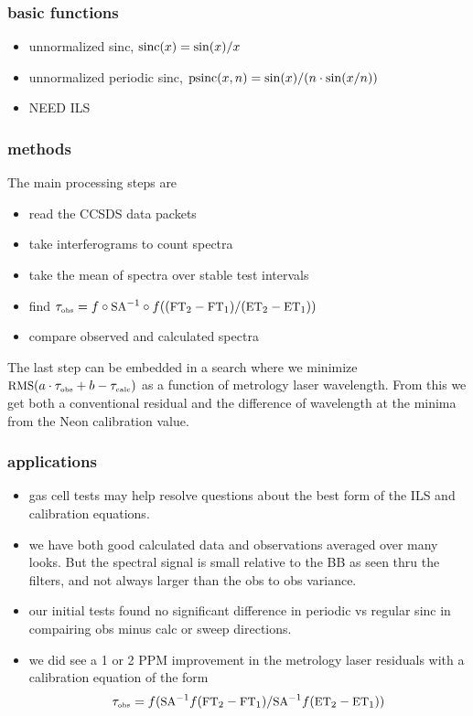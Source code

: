 \documentclass[11pt]{beamer}
\begin{document}
\begin{frame}
\frametitle{basic functions}

\begin{itemize}
  \item unnormalized sinc, $\mbox{sinc}(x) = \sin(x) / x$
  \item unnormalized periodic sinc, 
    $\mbox{psinc}(x, n) = \sin(x) / (n \cdot\sin(x/n))$
  \item NEED ILS
\end{itemize}

\end{frame}
\begin{frame}
\frametitle{methods}

The main processing steps are

\begin{itemize}
  \item read the CCSDS data packets
  \item take interferograms to count spectra
  \item take the mean of spectra over stable test intervals
  \item find $\tau_{\mbox{\tiny obs}} = f\circ\mbox{\small SA}^{-1}\circ f((\mbox{\small FT}_2 - \mbox{\small FT}_1) / (\mbox{\small ET}_2 - \mbox{\small ET}_1))$
  \item compare observed and calculated spectra
\end{itemize}

The last step can be embedded in a search where we minimize
$\mbox{\small RMS}(a\cdot\tau_{\mbox{\tiny obs}} + b - \tau_{\mbox{\tiny calc}})$ as a function of metrology laser
wavelength.  From this we get both a conventional residual and the
difference of wavelength at the minima from the Neon calibration
value.

\end{frame}
\begin{frame}
\frametitle{applications}

\begin{itemize}
  \item gas cell tests may help resolve questions about the best
    form of the ILS and calibration equations.

  \item we have both good calculated data and observations averaged
    over many looks.  But the spectral signal is small relative to
    the BB as seen thru the filters, and not always larger than the
    obs to obs variance.

  \item our initial tests found no significant difference in
    periodic vs regular sinc in compairing obs minus calc or sweep
    directions.

  \item we did see a 1 or 2 PPM improvement in the metrology laser
    residuals with a calibration equation of the form
    \[\tau_{\mbox{\tiny obs}} = f(\mbox{\small SA}^{-1}f(\mbox{\small FT}_2 - \mbox{\small FT}_1) / \mbox{\small SA}^{-1}f(\mbox{\small ET}_2 - \mbox{\small ET}_1)) \]

\end{itemize}

\end{frame}
\end{document}
